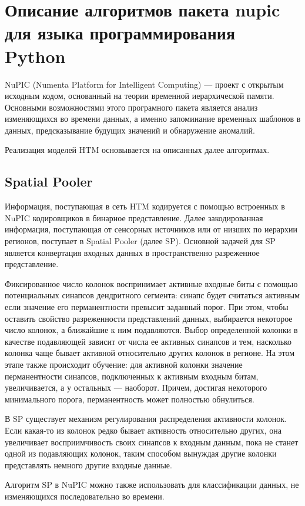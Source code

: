 \section{Описание алгоритмов пакета nupic для языка программирования Python}
NuPIC (Numenta Platform for Intelligent Computing) --- проект с открытым исходным кодом, основанный на теории временной иерархической памяти. Основными возможностями этого програмного пакета является анализ изменяющихся во времени данных, а именно  запоминание временных шаблонов в данных, предсказывание будущих значений и обнаружение аномалий. 

Реализация моделей HTM основывается на описанных далее алгоритмах.

\subsection{Spatial Pooler} 
Информация, поступающая в сеть HTM кодируется с помощью встроенных в NuPIC кодировщиков в бинарное представление. Далее закодированная информация, поступающая от сенсорных источников или от низших по иерархии регионов, поступает в Spatial Pooler (далее SP). Основной задачей для SP является конвертация входных данных в пространственно разреженное представление. 

Фиксированное число колонок воспринимает активные входные биты с помощью потенциальных синапсов дендритного сегмента: синапс будет считаться активным если значение его перманентности превысит заданный порог. При этом, чтобы оставить свойство разреженности представлений данных, выбирается некоторое число колонок, а ближайшие к ним подавляются. Выбор определенной колонки в качестве подавляющей зависит от числа ее активных синапсов и тем, насколько колонка чаще бывает активной относительно других колонок в регионе. На этом этапе также происходит обучение: для активной колонки значение перманентности синапсов, подключенных к активным входным битам, увеличивается, а у остальных --- наоборот. Причем, достигая некоторого минимального порога, перманентность может полностью обнулиться.

В SP существует механизм регулирования распределения активности колонок. Если какая-то из колонок редко бывает активность относительно других, она увеличивает восприимчивость своих синапсов к входным данным, пока не станет одной из подавляющих колонок, таким способом вынуждая другие колонки представлять немного другие входные данные.

Алгоритм SP в NuPIC можно также использовать для классификации данных, не изменяющихся последовательно во времени.

